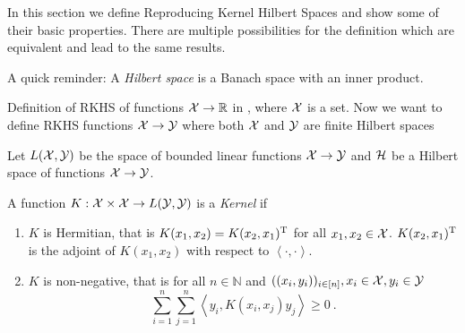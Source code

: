 In this section we define Reproducing Kernel Hilbert Spaces and show some of their basic properties.
There are multiple possibilities for the definition which are equivalent and lead to the same results.

A quick reminder: A \emph{Hilbert space} is a Banach space with an inner product.

Definition of RKHS of functions $\mathcal{X} \rightarrow \mathbb{R}$ in \cite{sejdinovic12}, where $\mathcal{X}$ is a set.
Now we want to define RKHS functions $\mathcal{X} \rightarrow \mathcal{Y}$ where both $\mathcal{X}$ and $\mathcal{Y}$ are finite Hilbert spaces 

Let $L(\mathcal{X}, \mathcal{Y})$ be the space of bounded linear functions $\mathcal{X} \rightarrow \mathcal{Y}$ and $\mathcal{H}$ be a Hilbert space of functions $\mathcal{X} \rightarrow \mathcal{Y}$.

\begin{definition}
	\label{def:kernel}
	A function $K: \mathcal{X} \times \mathcal{X} \rightarrow L(\mathcal{Y}, \mathcal{Y})$ is a \emph{Kernel} if
	\begin{enumerate}
		\item $K$ is Hermitian, that is $K(x_1, x_2) = K(x_2, x_1)^{\mathrm{T}}$ for all $x_1, x_2 \in \mathcal{X}$. 
		$K(x_2, x_1)^{\mathrm{T}}$ is the adjoint of $K(x_1, x_2)$ with respect to $\left<\cdot, \cdot\right>$.
		\item $K$ is non-negative, that is for all $n \in \mathbb{N}$ and $((x_i, y_i))_{i \in [n]}, x_i \in \mathcal{X}, y_i \in \mathcal{Y}$
		\begin{equation}
			\sum_{i=1}^n \sum_{j=1}^n \left< y_i, K(x_i, x_j)  y_j\right> \geq 0 \ .
		\end{equation}
	\end{enumerate}
\end{definition}

